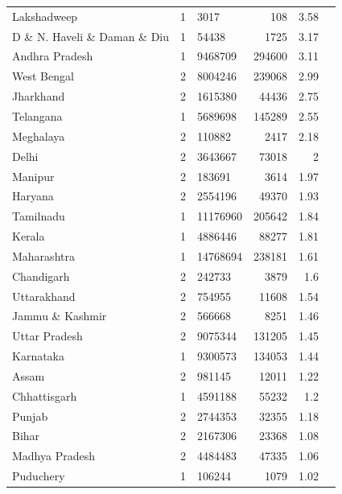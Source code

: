 \documentclass{article}
\begin{document}
\begin{table}[h!]
{\begin{tabular}{|l|l|l|r|r|r|}
		Lakshadweep                    & 1 & 3017     & 108     & 3.58  \\
		D \& N. Haveli \& Daman \& Diu & 1 & 54438    & 1725    & 3.17  \\
		Andhra Pradesh                 & 1 & 9468709  & 294600  & 3.11  \\
		West Bengal                    & 2 & 8004246  & 239068  & 2.99  \\
		Jharkhand                      & 2 & 1615380  & 44436   & 2.75  \\
		Telangana                      & 1 & 5689698  & 145289  & 2.55  \\
		Meghalaya                      & 2 & 110882   & 2417    & 2.18  \\
		Delhi                          & 2 & 3643667  & 73018   & 2     \\
		Manipur                        & 2 & 183691   & 3614    & 1.97  \\
		Haryana                        & 2 & 2554196  & 49370   & 1.93  \\
		Tamilnadu                      & 1 & 11176960 & 205642  & 1.84  \\
		Kerala                         & 1 & 4886446  & 88277   & 1.81  \\
		Maharashtra                    & 1 & 14768694 & 238181  & 1.61  \\
		Chandigarh                     & 2 & 242733   & 3879    & 1.6   \\
		Uttarakhand                    & 2 & 754955   & 11608   & 1.54  \\
		Jammu \& Kashmir               & 2 & 566668   & 8251    & 1.46  \\
		Uttar Pradesh                  & 2 & 9075344  & 131205  & 1.45  \\
		Karnataka                      & 1 & 9300573  & 134053  & 1.44  \\
		Assam                          & 2 & 981145   & 12011   & 1.22  \\
		Chhattisgarh                   & 1 & 4591188  & 55232   & 1.2   \\
		Punjab                         & 2 & 2744353  & 32355   & 1.18  \\
		Bihar                          & 2 & 2167306  & 23368   & 1.08  \\
		Madhya Pradesh                 & 2 & 4484483  & 47335   & 1.06  \\
		Puduchery                      & 1 & 106244   & 1079    & 1.02  \\

\end{tabular}}
\end{table}
\end{document}
